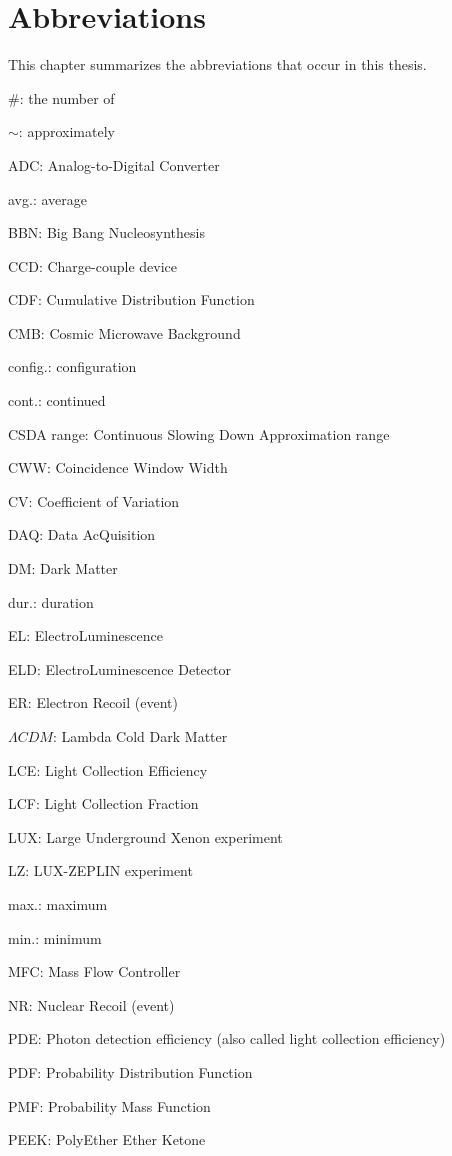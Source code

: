 \chapter{Abbreviations}
\label{chapter:abbrev}
This chapter summarizes the abbreviations that occur in this thesis.

\#: the number of

$\sim$: approximately

ADC: Analog-to-Digital Converter

avg.: average

BBN: Big Bang Nucleosynthesis

CCD: Charge-couple device

CDF:  Cumulative Distribution Function

CMB: Cosmic Microwave Background

config.: configuration

cont.: continued

CSDA range: Continuous Slowing Down Approximation range

CWW: Coincidence Window Width

CV: Coefficient of Variation

DAQ: Data AcQuisition

DM: Dark Matter

dur.: duration

EL: ElectroLuminescence

ELD: ElectroLuminescence Detector

ER: Electron Recoil (event)

$\Lambda CDM$: Lambda Cold Dark Matter

LCE: Light Collection Efficiency

LCF: Light Collection Fraction

LUX: Large Underground Xenon experiment

LZ: LUX-ZEPLIN experiment

max.: maximum

min.: minimum

MFC: Mass Flow Controller


NR: Nuclear Recoil (event)

PDE: Photon detection efficiency (also called light collection efficiency)

PDF: Probability Distribution Function

PMF: Probability Mass Function

PEEK: PolyEther Ether Ketone

